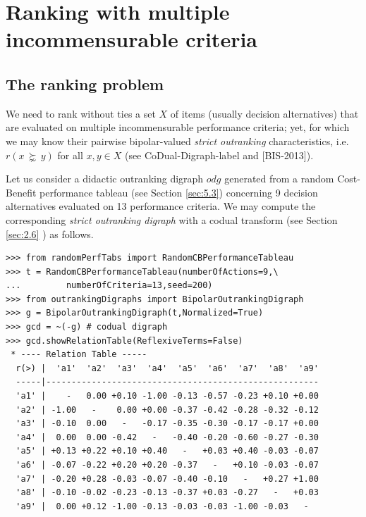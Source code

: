 \chapter{Ranking with multiple incommensurable criteria}
\label{sec:8}



\section{The ranking problem}
\label{sec:8.1}

We need to rank without ties a set $X$ of items (usually decision alternatives) that are evaluated on multiple incommensurable performance criteria; yet, for which we may know their pairwise bipolar-valued {\em strict outranking\/} characteristics, i.e. $r(x\, \succnsim \, y)$ for all $x, y \in X$ (see CoDual-Digraph-label and [BIS-2013]).

Let us consider a didactic outranking digraph $odg$ generated from a random Cost-Benefit performance tableau (see Section \ref{sec:5.3}) concerning 9 decision alternatives evaluated on 13 performance criteria. We may compute the corresponding {\em strict outranking digraph\/} with a codual transform (see Section \ref{sec:2.6} ) as follows.

\begin{lstlisting}[caption={Random bipolar-valued strict outranking relation characteristics},label=list:8.1]
>>> from randomPerfTabs import RandomCBPerformanceTableau   
>>> t = RandomCBPerformanceTableau(numberOfActions=9,\
...         numberOfCriteria=13,seed=200)
>>> from outrankingDigraphs import BipolarOutrankingDigraph
>>> g = BipolarOutrankingDigraph(t,Normalized=True)
>>> gcd = ~(-g) # codual digraph
>>> gcd.showRelationTable(ReflexiveTerms=False)
 * ---- Relation Table -----
  r(>) |  'a1'  'a2'  'a3'  'a4'  'a5'  'a6'  'a7'  'a8'  'a9'   
  -----|------------------------------------------------------
  'a1' |    -   0.00 +0.10 -1.00 -0.13 -0.57 -0.23 +0.10 +0.00  
  'a2' | -1.00   -    0.00 +0.00 -0.37 -0.42 -0.28 -0.32 -0.12  
  'a3' | -0.10  0.00   -   -0.17 -0.35 -0.30 -0.17 -0.17 +0.00  
  'a4' |  0.00  0.00 -0.42   -   -0.40 -0.20 -0.60 -0.27 -0.30  
  'a5' | +0.13 +0.22 +0.10 +0.40   -   +0.03 +0.40 -0.03 -0.07  
  'a6' | -0.07 -0.22 +0.20 +0.20 -0.37   -   +0.10 -0.03 -0.07  
  'a7' | -0.20 +0.28 -0.03 -0.07 -0.40 -0.10   -   +0.27 +1.00  
  'a8' | -0.10 -0.02 -0.23 -0.13 -0.37 +0.03 -0.27   -   +0.03  
  'a9' |  0.00 +0.12 -1.00 -0.13 -0.03 -0.03 -1.00 -0.03   -   
\end{lstlisting}
  
